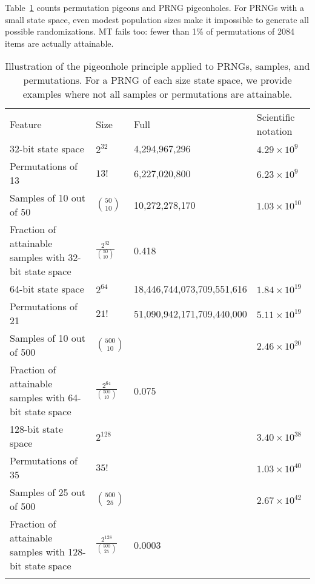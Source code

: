 \documentclass[graybox]{svmult}
\begin{document}
Table~\ref{tab:pigeonhole} counts permutation pigeons and PRNG pigeonholes.
For PRNGs with a small state space, even modest population sizes make it impossible to generate all possible randomizations.
MT fails too: fewer than 1\% of permutations of 2084 items are actually attainable.

\begin{table}
\caption{Illustration of the pigeonhole principle applied to PRNGs, samples, and permutations.
For a PRNG of each size state space, we provide examples where not all samples or permutations are attainable.}
\label{tab:pigeonhole}       
\begin{tabular}[h]{p{4cm}p{2.4cm}p{4cm}p{2cm}}
\hline\noalign{\smallskip}
Feature & Size & Full & Scientific notation  \\
\noalign{\smallskip}\svhline\noalign{\smallskip}
32-bit state space & $2^{32}$ & 4,294,967,296 & $4.29 \times 10^9$ \\
Permutations of 13 & $13!$ & 6,227,020,800 & $6.23 \times 10^9$ \\
Samples of 10 out of 50 & ${50 \choose 10}$ &  10,272,278,170 & $1.03\times 10^{10} $ \\
Fraction of attainable samples with 32-bit state space & $\frac{2^{32}}{{50 \choose 10}}$   & 0.418 & \\
\noalign{\smallskip}\svhline\noalign{\smallskip}
64-bit state space & $2^{64}$ & 18,446,744,073,709,551,616 & $1.84 \times 10^{19}$ \\
Permutations of 21 & $21!$ &  51,090,942,171,709,440,000 & $5.11 \times 10^{19}$ \\
Samples of 10 out of 500 & ${500 \choose 10}$ & & $2.46 \times 10^{20}$ \\
Fraction of attainable samples with 64-bit state space & $\frac{2^{64}}{{500 \choose 10}}$ &  0.075 & \\
\noalign{\smallskip}\svhline\noalign{\smallskip}
128-bit state space & $2^{128}$ &  & $3.40 \times 10^{38}$ \\
Permutations of 35 & $35!$ &   & $1.03 \times 10^{40}$ \\
Samples of 25 out of 500 & ${500 \choose 25}$ & & $2.67 \times 10^{42}$ \\
Fraction of attainable samples with 128-bit state space & $\frac{2^{128}}{{500 \choose 25}}$ &  0.0003 & \\
\noalign{\smallskip}\svhline\noalign{\smallskip}

\end{tabular}
\end{table}
\end{document}
